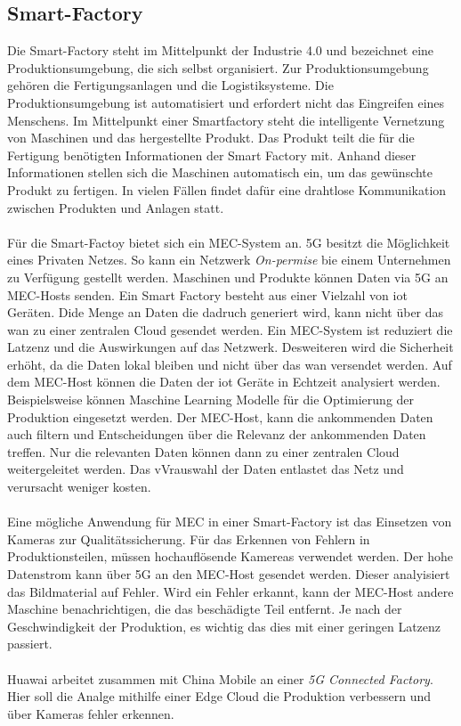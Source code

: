 \documentclass[runningheads]{llncs}
\numberwithin{figure}{section}
\begin{document}
\subsection{Smart-Factory}
Die Smart-Factory steht im Mittelpunkt der Industrie 4.0 und bezeichnet eine Produktionsumgebung, die sich selbst organisiert. 
Zur Produktionsumgebung gehören die Fertigungsanlagen und die Logistiksysteme. Die Produktionsumgebung ist automatisiert und erfordert
nicht das Eingreifen eines Menschens. 
Im Mittelpunkt einer Smartfactory steht die intelligente Vernetzung von Maschinen und das hergestellte Produkt. 
Das Produkt teilt die für die Fertigung benötigten Informationen der Smart Factory mit. 
Anhand dieser Informationen stellen sich die Maschinen automatisch ein, um das gewünschte Produkt zu fertigen. 
In vielen Fällen findet dafür eine drahtlose Kommunikation zwischen Produkten und Anlagen statt. 
\\
\\
Für die Smart-Factoy bietet sich ein MEC-System an. 5G besitzt die Möglichkeit eines Privaten Netzes. 
So kann ein Netzwerk \textit{On-permise} bie einem Unternehmen zu Verfügung gestellt werden. 
Maschinen und Produkte können Daten via 5G an MEC-Hosts senden.
Ein Smart Factory besteht aus einer Vielzahl von \acrfull{iot} Geräten. Dide Menge an Daten die dadruch 
generiert wird, kann nicht über das \acrshort{wan} zu einer zentralen Cloud gesendet werden. Ein MEC-System ist reduziert die Latzenz
und die Auswirkungen auf das Netzwerk. Desweiteren wird die Sicherheit erhöht, da die Daten lokal bleiben und nicht über 
das \acrshort{wan} versendet werden. Auf dem MEC-Host können die Daten der \acrshort{iot} Geräte in Echtzeit analysiert werden. Beispielsweise können
Maschine Learning Modelle für die Optimierung der Produktion eingesetzt werden. Der MEC-Host, kann die ankommenden Daten auch filtern und Entscheidungen über
die Relevanz der ankommenden Daten treffen. Nur die relevanten Daten können dann zu einer zentralen Cloud weitergeleitet werden. Das vVrauswahl der Daten entlastet
das Netz und verursacht weniger kosten.
\\
\\
Eine mögliche Anwendung für MEC in einer Smart-Factory ist das Einsetzen von Kameras zur Qualitätssicherung.
Für das Erkennen von Fehlern in Produktionsteilen, müssen hochauflösende Kamereas verwendet werden. Der hohe Datenstrom
kann über 5G an den MEC-Host gesendet werden. Dieser analyisiert das Bildmaterial auf Fehler. Wird ein Fehler erkannt,
kann der MEC-Host andere Maschine benachrichtigen, die das beschädigte Teil entfernt. Je nach der Geschwindigkeit der Produktion,
es wichtig das dies mit einer geringen Latzenz passiert. 
\\
\\
Huawai arbeitet zusammen mit China Mobile an einer \textit{5G Connected Factory}. Hier soll die Analge mithilfe 
einer Edge Cloud die Produktion verbessern und über Kameras fehler erkennen. \cite{WhatNextgenFactory}
\end{document}
